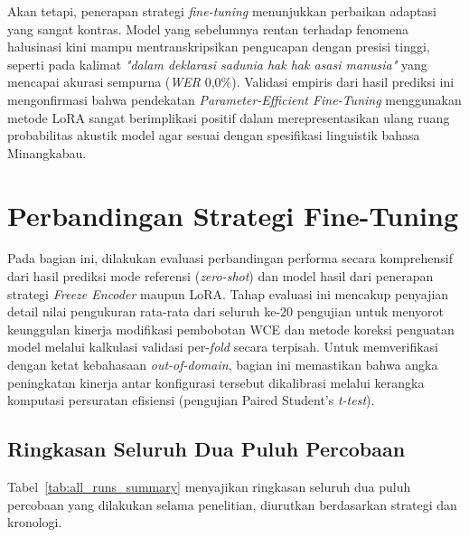 Akan tetapi, penerapan strategi \textit{fine-tuning} menunjukkan perbaikan adaptasi yang sangat kontras. Model yang sebelumnya rentan terhadap fenomena halusinasi kini mampu mentranskripsikan pengucapan dengan presisi tinggi, seperti pada kalimat \textit{"dalam deklarasi sadunia hak hak asasi manusia"} yang mencapai akurasi sempurna (\textit{WER} 0,0\%). Validasi empiris dari hasil prediksi ini mengonfirmasi bahwa pendekatan \textit{Parameter-Efficient Fine-Tuning} menggunakan metode LoRA sangat berimplikasi positif dalam merepresentasikan ulang ruang probabilitas akustik model agar sesuai dengan spesifikasi linguistik bahasa Minangkabau.


\section{Perbandingan Strategi Fine-Tuning} \label{IV.Perbandingan}

Pada bagian ini, dilakukan evaluasi perbandingan performa secara komprehensif dari hasil prediksi mode referensi (\textit{zero-shot}) dan model hasil dari penerapan strategi \textit{Freeze Encoder} maupun LoRA. Tahap evaluasi ini mencakup penyajian detail nilai pengukuran rata-rata dari seluruh ke-20 pengujian untuk menyorot keunggulan kinerja modifikasi pembobotan WCE dan metode koreksi penguatan model melalui kalkulasi validasi per-\textit{fold} secara terpisah. Untuk memverifikasi dengan ketat kebahasaan \textit{out-of-domain}, bagian ini memastikan bahwa angka peningkatan kinerja antar konfigurasi tersebut dikalibrasi melalui kerangka komputasi persuratan efisiensi (pengujian Paired Student's \textit{t-test}).

\subsection{Ringkasan Seluruh Dua Puluh Percobaan}

Tabel~\ref{tab:all_runs_summary} menyajikan ringkasan seluruh dua puluh percobaan yang dilakukan selama penelitian, diurutkan berdasarkan strategi dan kronologi.

